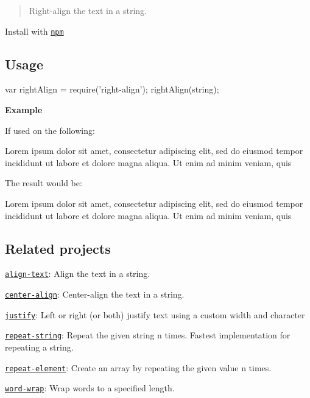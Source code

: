 \begin{quote}
Right-\/align the text in a string. \end{quote}


Install with \href{https://www.npmjs.com/}{\tt npm}




\subsection*{Usage}


\begin{DoxyCode}
var rightAlign = require('right-align');
rightAlign(string);
\end{DoxyCode}


{\bfseries Example}

If used on the following\+:


\begin{DoxyCode}
Lorem ipsum dolor sit amet,
consectetur adipiscing
elit, sed do eiusmod tempor incididunt
ut labore et dolore
magna aliqua. Ut enim ad minim
veniam, quis
\end{DoxyCode}


The result would be\+:


\begin{DoxyCode}
           Lorem ipsum dolor sit amet,
                consectetur adipiscing
elit, sed do eiusmod tempor incididunt
                   ut labore et dolore
        magna aliqua. Ut enim ad minim
                          veniam, quis
\end{DoxyCode}


\subsection*{Related projects}


\begin{DoxyItemize}
\item \href{https://github.com/jonschlinkert/align-text}{\tt align-\/text}\+: Align the text in a string.
\item \href{https://github.com/jonschlinkert/center-align}{\tt center-\/align}\+: Center-\/align the text in a string.
\item \href{https://github.com/bahamas10/node-justify}{\tt justify}\+: Left or right (or both) justify text using a custom width and character
\item \href{https://github.com/jonschlinkert/repeat-string}{\tt repeat-\/string}\+: Repeat the given string n times. Fastest implementation for repeating a string.
\item \href{https://github.com/jonschlinkert/repeat-element}{\tt repeat-\/element}\+: Create an array by repeating the given value n times.
\item \href{https://github.com/jonschlinkert/word-wrap}{\tt word-\/wrap}\+: Wrap words to a specified length.
\end{DoxyItemize}

